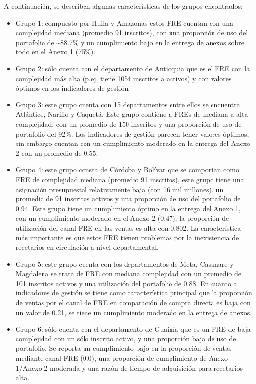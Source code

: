 \documentclass[
]{book}
\begin{document}
A continuación, se describen algunas características de los grupos encontrados:

\begin{itemize}
\item
  Grupo 1: compuesto por Huila y Amazonas estos FRE cuentan con una complejidad mediana (promedio 91 inscritos), con una proporción de uso del portafolio de \textasciitilde88.7\% y un cumplimiento bajo en la entrega de anexos sobre todo en el Anexo 1 (75\%).
\item
  Grupo 2: sólo cuenta con el departamento de Antioquia que es el FRE con la complejidad más alta (p.ej. tiene 1054 inscritos a activos) y con valores óptimos en los indicadores de gestión.
\item
  Grupo 3: este grupo cuenta con 15 departamentos entre ellos se encuentra Atlántico, Nariño y Caquetá. Este grupo contiene a FREs de mediana a alta complejidad, con un promedio de 150 inscritos y una proporción de uso de portafolio del 92\%. Los indicadores de gestión parecen tener valores óptimos, sin embargo cuentan con un cumplimiento moderado en la entrega del Anexo 2 con un promedio de 0.55.
\item
  Grupo 4: este grupo consta de Córdoba y Bolívar que se comportan como FRE de complejidad mediana (promedio 91 inscritos), este grupo tiene una asignación presupuestal relativamente baja (con 16 mil millones), un promedio de 91 inscritos activos y una proporción de uso del portafolio de 0.94. Este grupo tiene un cumplimiento óptimo en la entrega del Anexo 1, con un cumplimiento moderado en el Anexo 2 (0.47), la proporción de utilización del canal FRE en las ventas es alta con 0.802. La característica más importante es que estos FRE tienen problemas por la inexistencia de recetarios en circulación a nivel departamental.
\item
  Grupo 5: este grupo cuenta con los departamentos de Meta, Casanare y Magdalena se trata de FRE con mediana complejidad con un promedio de 101 inscritos activos y una utilización del portafolio de 0.88. En cuanto a indicadores de gestión se tiene como característica principal que la proporción de ventas por el canal de FRE en comparación de compra directa es baja con un valor de 0.21, se tiene un cumplimiento moderado en la entrega de anexos.
\item
  Grupo 6: sólo cuenta con el departamento de Guainía que es un FRE de baja complejidad con un sólo inscrito activo, y una proporción baja de uso de portafolio. Se reporta un cumplimiento bajo en la proporción de ventas mediante canal FRE (0.0), una proporción de cumplimiento de Anexo 1/Anexo 2 moderada y una razón de tiempo de adquisición para recetarios alta.

\end{itemize}
\end{document}
